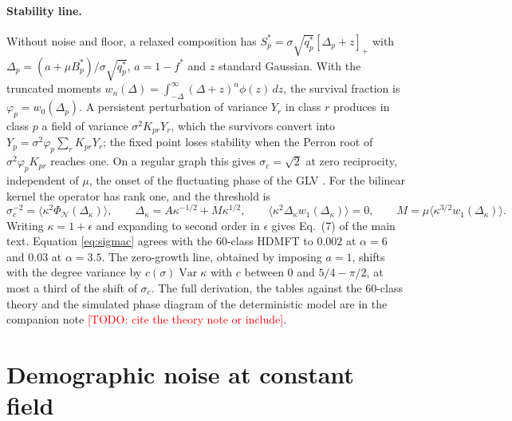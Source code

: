 \documentclass[pre,onecolumn,superscriptaddress,nofootinbib]{revtex4-2}
\newcommand{\Var}{\operatorname{Var}}
\newcommand{\PhiN}{\Phi_{\mathcal N}}
\newcommand{\todo}[1]{\textcolor{red}{[TODO: #1]}}
\begin{document}
\paragraph{Stability line.}  Without noise and floor, a relaxed composition has $S_p^*=\sigma\sqrt{q_p^*}
[\Delta_p+z]_+$ with $\Delta_p=(a+\mu B_p^*)/\sigma\sqrt{q_p^*}$, $a=1-f^*$ and $z$ standard Gaussian.  With the
truncated moments $w_n(\Delta)=\int_{-\Delta}^\infty(\Delta+z)^n\phi(z)\,dz$, the survival fraction is
$\varphi_p=w_0(\Delta_p)$.  A persistent perturbation of variance $Y_r$ in class $r$ produces in class $p$ a
field of variance $\sigma^2K_{pr}Y_r$, which the survivors convert into $Y_p=\sigma^2\varphi_p\sum_rK_{pr}Y_r$; the
fixed point loses stability when the Perron root of $\sigma^2\varphi_pK_{pr}$ reaches one.  On a regular graph
this gives $\sigma_c=\sqrt2$ at zero reciprocity, independent of $\mu$, the onset of the fluctuating
phase of the GLV \cite{roy2020,mallmin2024}.  For the bilinear kernel the operator has rank one, and
the threshold is
\begin{equation}
\sigma_c^{-2}=\big\langle\kappa^2\PhiN(\Delta_\kappa)\big\rangle,\qquad \Delta_\kappa=A\kappa^{-1/2}+M\kappa^{1/2},\qquad
\big\langle\kappa^2\Delta_\kappa w_1(\Delta_\kappa)\big\rangle=0,\qquad M=\mu\big\langle\kappa^{3/2}w_1(\Delta_\kappa)\big\rangle .
\label{eq:sigmac}
\end{equation}
Writing $\kappa=1+\epsilon$ and expanding to second order in $\epsilon$ gives Eq.~(7) of the main text.  Equation
\eqref{eq:sigmac} agrees with the 60-class HDMFT to $0.002$ at $\alpha=6$ and $0.03$ at $\alpha=3.5$.  The
zero-growth line, obtained by imposing $a=1$, shifts with the degree variance by
$c(\sigma)\Var\kappa$ with $c$ between $0$ and $5/4-\pi/2$, at most a third of the shift of $\sigma_c$.  The full
derivation, the tables against the 60-class theory and the simulated phase diagram of the
deterministic model are in the companion note \todo{cite the theory note or include}.

\section{Demographic noise at constant field}
\label{sec:constant}
\end{document}
